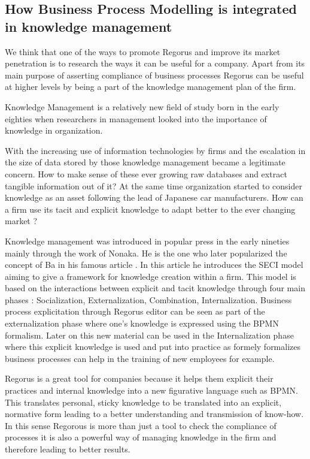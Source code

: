 \documentclass[10pt]{report}
\begin{document}
\subsection{How Business Process Modelling is integrated in knowledge management}

We think that one of the ways to promote Regorus and improve its market penetration is to research the ways it can be useful for a company. Apart from its main purpose of asserting compliance of business processes Regorus can be useful at higher levels by being a part of the knowledge management plan of the firm.

Knowledge Management is a relatively new field of study born in the early eighties when researchers in management looked into the importance of knowledge in organization.\autocite{Wiig19971}

With the increasing use of information technologies by firms and the escalation in the size of data stored by those knowledge management became a legitimate concern. How to make sense of these ever growing raw databases and extract tangible information out of it? At the same time organization started to consider knowledge as an asset following the lead of Japanese car manufacturers.\autocite{Koenig08} How can a firm use its tacit and explicit knowledge to adapt better to the ever changing market ?

Knowledge management was introduced in popular press in the early nineties mainly through the work of Nonaka. \autocite{nonaka1991knowledge} He is the one who later popularized the concept of Ba in his famous article \autocite{Nonaka_Konno_1998}. In this article he introduces the SECI model aiming to give a framework for knowledge creation within a firm. This model is based on the interactions between explicit and tacit knowledge through four main phases : Socialization, Externalization, Combination, Internalization. Business process explicitation through Regorus editor can be seen as part of the externalization phase where one's knowledge is expressed using the BPMN formalism. Later on this new material can be used in the Internalization phase where this explicit knowledge is used and put into practice as formely formalizes business processes can help in the training of new employees for example.

Regorus is a great tool for companies because it helps them explicit their practices and internal knowledge into a new figurative language such as BPMN. This translates personal, sticky knowledge to be translated into an explicit, normative form leading to a better understanding and transmission of know-how. In this sense Regorous is more than just a tool to check the compliance of processes it is also a powerful way of managing knowledge in the firm and therefore leading to better results.
\end{document}
